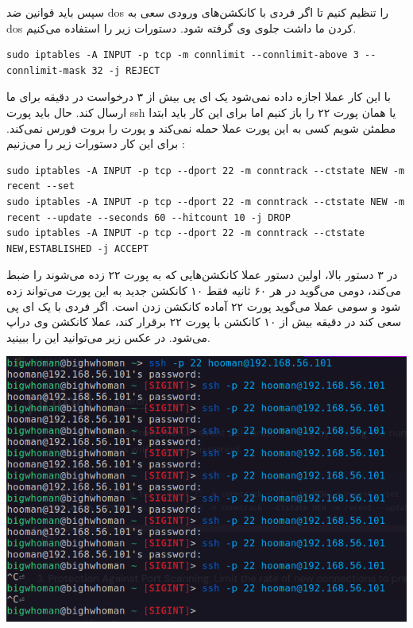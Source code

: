 سپس باید قوانین ضد dos را تنظیم کنیم تا اگر 
فردی با کانکشن‌های ورودی سعی به dos کردن ما داشت جلوی وی گرفته شود.
دستورات زیر را استفاده می‌کنیم.
\begin{latin}   
\begin{lstlisting}
sudo iptables -A INPUT -p tcp -m connlimit --connlimit-above 3 --connlimit-mask 32 -j REJECT
\end{lstlisting}
\end{latin}
با این کار عملا اجازه داده نمی‌شود یک ای پی بیش از ۳ 
درخواست در دقیقه برای ما ارسال کند.
حال باید پورت ssh یا همان پورت ۲۲ را باز کنیم اما 
برای این کار باید ابتدا مطمئن شویم کسی به این پورت عملا حمله نمی‌کند و پورت را بروت فورس نمی‌کند. 
برای این کار دستورات زیر را می‌زنیم : 
\begin{latin}   
\begin{lstlisting}
sudo iptables -A INPUT -p tcp --dport 22 -m conntrack --ctstate NEW -m recent --set
sudo iptables -A INPUT -p tcp --dport 22 -m conntrack --ctstate NEW -m recent --update --seconds 60 --hitcount 10 -j DROP
sudo iptables -A INPUT -p tcp --dport 22 -m conntrack --ctstate NEW,ESTABLISHED -j ACCEPT
\end{lstlisting}
\end{latin}
در ۳ دستور بالا، اولین دستور عملا کانکشن‌هایی که به پورت ۲۲ زده می‌شوند را ضبط می‌کند، دومی می‌گوید در هر ۶۰ ثانیه فقط ۱۰ کانکشن جدید به این پورت می‌تواند زده شود و سومی عملا می‌گوید پورت ۲۲ آماده کانکشن زدن است.
اگر فردی با یک ای پی سعی کند در دقیقه بیش از 
۱۰ کانکشن با پورت ۲۲ برقرار کند، عملا کانکشن وی 
دراپ می‌شود. در عکس زیر می‌توانید این را ببینید.
\begin{center}
    \includegraphics[scale=0.30]{pics/iptables3.png}
\end{center}
